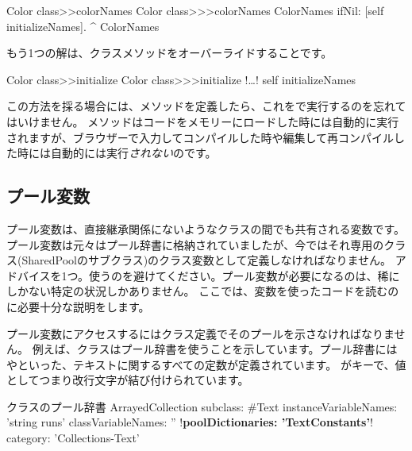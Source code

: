 \documentclass[a4paper,10pt,twoside]{book}
\begin{document}
\begin{method}[colorclasscolornames]{Color class>>colorNames}
Color class>>>colorNames	
	ColorNames ifNil: [self initializeNames].
	^ ColorNames
\end{method}	

もう1つの解は、クラスメソッドをオーバーライドすることです。

\begin{method}[colorclassinit]{Color class>>initialize}
Color class>>>initialize	
	!\ldots!
	self initializeNames
\end{method}	

\noindent
この方法を採る場合には、メソッドを定義したら、これをで実行するのを忘れてはいけません。
 メソッドはコードをメモリーにロードした時には自動的に実行されますが、ブラウザーで入力してコンパイルした時や編集して再コンパイルした時には自動的には実行\emph{されない}のです。

\subsection{プール変数}
プール変数は、直接継承関係にないようなクラスの間でも共有される変数です。
プール変数は元々はプール辞書に格納されていましたが、今ではそれ専用のクラス(SharedPoolのサブクラス)のクラス変数として定義しなければなりません。
アドバイスを1つ。使うのを避けてください。プール変数が必要になるのは、稀にしかない特定の状況しかありません。
ここでは、変数を使ったコードを読むのに必要十分な説明をします。

プール変数にアクセスするにはクラス定義でそのプールを示さなければなりません。
例えば、クラスはプール辞書を使うことを示しています。プール辞書にはやといった、テキストに関するすべての定数が定義されています。
がキーで、値としてつまり改行文字が結び付けられています。

\begin{classdef}[textpooldict]{クラスのプール辞書}
ArrayedCollection subclass: #Text
        instanceVariableNames: 'string runs' 	
        classVariableNames: '' 	
        !\textbf{poolDictionaries: 'TextConstants'}!
        category: 'Collections-Text'
\end{classdef}
   
\end{document}
